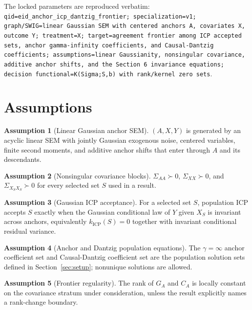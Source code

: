 \documentclass[11pt]{article}
\theoremstyle{definition}
\newtheorem{assumption}{Assumption}
\theoremstyle{plain}
\theoremstyle{remark}
\begin{document}
The locked parameters are reproduced verbatim: \texttt{qid=eid\_anchor\_icp\_dantzig\_frontier; specialization=v1; graph/SWIG=linear Gaussian SEM with centered anchors A, covariates X, outcome Y; treatment=X; target=agreement frontier among ICP accepted sets, anchor gamma-infinity coefficients, and Causal-Dantzig coefficients; assumptions=linear Gaussianity, nonsingular covariance, additive anchor shifts, and the Section 6 invariance equations; decision functional=K(Sigma;S,b) with rank/kernel zero sets}.

\section{Assumptions}
\begin{assumption}[Linear Gaussian anchor SEM]\label{ass:sem}
$(A,X,Y)$ is generated by an acyclic linear SEM with jointly Gaussian exogenous noise, centered variables, finite second moments, and additive anchor shifts that enter through $A$ and its descendants.
\end{assumption}

\begin{assumption}[Nonsingular covariance blocks]\label{ass:nonsing}
$\Sigma_{AA}\succ0$, $\Sigma_{XX}\succ0$, and $\Sigma_{X_SX_S}\succ0$ for every selected set $S$ used in a result.
\end{assumption}

\begin{assumption}[Gaussian ICP acceptance]\label{ass:icp}
For a selected set $S$, population ICP accepts $S$ exactly when the Gaussian conditional law of $Y$ given $X_S$ is invariant across anchors, equivalently $k_{\mathrm{ICP}}(S)=0$ together with invariant conditional residual variance.
\end{assumption}

\begin{assumption}[Anchor and Dantzig population equations]\label{ass:arcd}
The $\gamma=\infty$ anchor coefficient set and Causal-Dantzig coefficient set are the population solution sets defined in Section~\ref{sec:setup}; nonunique solutions are allowed.
\end{assumption}

\begin{assumption}[Frontier regularity]\label{ass:frontier}
The rank of $G_A$ and $C_A$ is locally constant on the covariance stratum under consideration, unless the result explicitly names a rank-change boundary.
\end{assumption}
\end{document}
